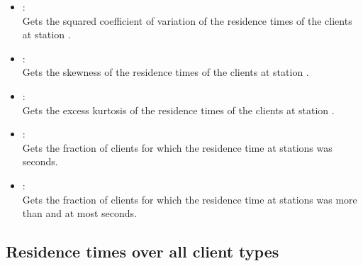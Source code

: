 \begin{itemize}
\item
{}:\\
Gets the squared coefficient of variation of the residence times of the clients at station .

\item
{}:\\
Gets the skewness of the residence times of the clients at station . 

\item
{}:\\
Gets the excess kurtosis of the residence times of the clients at station . 

\item
{}:\\
Gets the fraction of clients for which the residence time at stations  was  seconds.

\item
{}:\\
Gets the fraction of clients for which the residence time at stations  was more than  and at most  seconds.

\end{itemize}



\subsection{Residence times over all client types}
  
